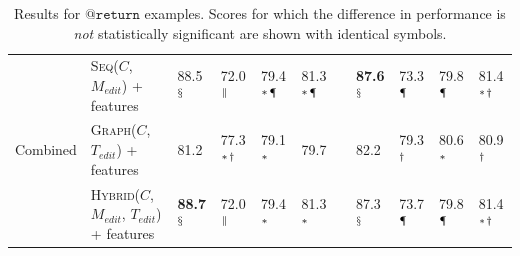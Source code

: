 \documentclass[letterpaper]{article} %
\makeatletter
\newcommand{\CodeIn}[1]{{\ifmmode{\mathtt{#1}}\else$\mathtt{#1}$\fi}}
\newcommand{\Return}{\CodeIn{@return}}
\newcommand{\Comment}{$C$}
\newcommand{\EditCode}{$M_{edit}$}
\newcommand{\EditTree}{$T_{edit}$}
\newcommand{\SeqModel}{\textsc{Seq}}
\newcommand{\GraphModel}{\textsc{Graph}}
\newcommand{\HybridModel}{\textsc{Hybrid}}
\newcommand{\JustInTimeSeq}{\SeqModel{}(\Comment{}, \EditCode{})}
\newcommand{\JustInTimeGraph}{\GraphModel{}(\Comment{}, \EditTree{})}
\newcommand{\JustInTimeHybrid}{\HybridModel{}(\Comment{}, \EditCode{}, \EditTree{})}
\def\@fnsymbol#1{\ensuremath{\ifcase#1\or *\or \dagger\or \ddagger\or
   \mathsection\or \mathparagraph\or \|\or **\or \dagger\dagger
   \or \ddagger\ddagger \else\@ctrerr\fi}}
\newcommand{\ssymbol}[1]{^{\@fnsymbol{#1}}}
\makeatother
\begin{document}
\begin{table}[ht]
\begin{tabular}{ll@{\hskip 3mm}lllllllll}
\hline
\multirow{3}{*}{Combined} &
\JustInTimeSeq{} + features  & 88.5$\ssymbol{4}$ & 72.0$\ssymbol{6}$ & 79.4$\ssymbol{1}$$\ssymbol{5}$ & 81.3$\ssymbol{1}$$\ssymbol{5}$ & & \bf 87.6$\ssymbol{4}$ & 73.3$\ssymbol{5}$ & 79.8$\ssymbol{5}$ & 81.4$\ssymbol{1}$$\ssymbol{2}$ \\
& \JustInTimeGraph{} + features  & 81.2 & 77.3$\ssymbol{1}$$\ssymbol{2}$ & 79.1$\ssymbol{1}$ & 79.7 & & 82.2 & 79.3$\ssymbol{2}$ & 80.6$\ssymbol{1}$ & 80.9$\ssymbol{2}$ \\
& \JustInTimeHybrid{} + features  & \bf 88.7$\ssymbol{4}$ & 72.0$\ssymbol{6}$ & 79.4$\ssymbol{1}$ & 81.3$\ssymbol{1}$ & & 87.3$\ssymbol{4}$ & 73.7$\ssymbol{5}$ & 79.8$\ssymbol{5}$ & 81.4$\ssymbol{1}$$\ssymbol{2}$ \\







\hline

\end{tabular}
\vspace{-5pt}
\caption{\label{table:return-table} Results for \Return{} examples. Scores for which the difference in performance is \textit{not} statistically significant are shown with identical symbols.}
\end{table}
\end{document}
